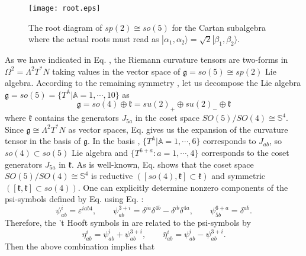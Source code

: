 \documentclass[12pt,epsf]{article}
\begin{document}
\begin{figure}
\centering
\texttt{[image: root.eps]}
\caption{The root diagram of $sp(2) \cong so(5)$ for the Cartan subalgebra 
where the actual roots must read as $|\alpha_1, \alpha_2 \rangle
= \sqrt{2}|\beta_1, \beta_2 \rangle$.}
\label{so5-root}
\end{figure}






As we have indicated in Eq. , the Riemann curvature tensors are two-forms
in $\Omega^2 = \Lambda^2 T^*N$ taking values in the vector space of $\mathfrak{g} = so(5) \cong sp(2)$ Lie algebra.
According to the remaining symmetry ,
let us decompose the Lie algebra $\mathfrak{g} = so(5) = \{ T^\mathbb{A}| \mathbb{A}= 1, \cdots, 10 \}$ as
\begin{equation}\label{decom-so5}
  \mathfrak{g} = so(4) \oplus \mathfrak{k} = su(2)_+ \oplus su(2)_- \oplus \mathfrak{k}
\end{equation}
where $\mathfrak{k}$ contains the generators $J_{5a}$ in the coset space $SO(5)/SO(4) \cong \mathbb{S}^4$.
Since $\mathfrak{g} \cong \Lambda^2 T^*N$ as vector spaces, Eq.  gives us the expansion
of the curvature tensor in the basis of $\mathfrak{g}$.
In the basis , $\{T^\mathbb{A}| \mathbb{A}= 1, \cdots, 6 \}$ corresponds to $J_{ab}$,
so $so(4) \subset so(5)$ Lie algebra and $\{T^{6+a}: a = 1, \cdots, 4 \}$ corresponds
to the coset generators $J_{5a}$ in $\mathfrak{k}$.
As is well-known, Eq.  shows that the coset space $SO(5)/SO(4) \cong \mathbb{S}^4$ is
reductive $([so(4), \mathfrak{k}] \subset \mathfrak{k})$ and symmetric $([\mathfrak{k}, \mathfrak{k}] \subset so(4))$.
One can explicitly determine nonzero components of the psi-symbols
defined by Eq.  using Eq. :
\begin{equation} \label{psi-comp}
  \psi^i_{ab} = \varepsilon^{iab4}, \qquad \psi^{3+i}_{ab} = \delta^{ia} \delta^{4b} - \delta^{ib} \delta^{4a},
  \qquad \psi^{6+a}_{5b} = \delta^{ab}.
\end{equation}
Therefore, the 't Hooft symbols in  are related to the psi-symbols by
\begin{equation}\label{two-symbol}
  \eta^i_{ab} = \psi^i_{ab} + \psi^{3+i}_{ab}, \qquad \bar{\eta}^i_{ab} = \psi^i_{ab} - \psi^{3+i}_{ab}.
\end{equation}
Then the above combination implies that
\end{document}
